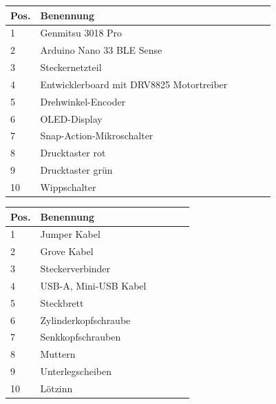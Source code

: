 \begin{figure}[H]
	\begin{center}
		\fontsize{8}{10}\selectfont
		\begin{tabularx}{\textwidth}{|p{0.4cm}|X|X|X|X|X|} 
			\hline 
			\textbf{Pos.} &  \textbf{Benennung} \\ \hline
			1 & Genmitsu 3018 Pro  \\ \hline
			2 & Arduino Nano 33 BLE Sense   \\ \hline
			3 & Steckernetzteil   \\ \hline
			4 & Entwicklerboard mit DRV8825 Motortreiber   \\ \hline
			5 & Drehwinkel-Encoder  \\ \hline
			6 & OLED-Display  \\ \hline
			7 & Snap-Action-Mikroschalter  \\ \hline
			8 & Drucktaster rot \\ \hline
			9 & Drucktaster grün  \\ \hline
			10 & Wippschalter  \\ \hline
			
		\end{tabularx}
			\label{EKomponenten}
	\end{center}
\end{figure}


\begin{figure}[H]
	\begin{center}
		\fontsize{8}{10}\selectfont
		\begin{tabularx}{\textwidth}{|p{0.4cm}|X|X|X|X|X|}  
			\hline 
			\textbf{Pos.} &  \textbf{Benennung} \\ \hline
			1 & Jumper Kabel  \\ \hline
			2 & Grove Kabel  \\ \hline
			3 & Steckerverbinder \\ \hline
			4 & USB-A, Mini-USB Kabel   \\ \hline
			5 & Steckbrett \\ \hline
			6 & Zylinderkopfschraube \\ \hline
			7 & Senkkopfschrauben \\ \hline
			8 & Muttern \\ \hline
			9 & Unterlegscheiben \\ \hline
			10 & Lötzinn \\ \hline
			
		\end{tabularx}
			\label{VKomponenten}
	\end{center}
\end{figure}


